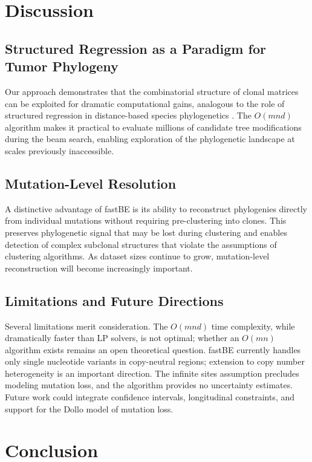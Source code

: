 \documentclass[11pt]{article}
\begin{document}
\section{Discussion}

\subsection{Structured Regression as a Paradigm for Tumor Phylogeny}

Our approach demonstrates that the combinatorial structure of clonal matrices can be exploited for dramatic computational gains, analogous to the role of structured regression in distance-based species phylogenetics \citep{desper2002fast, price2010fasttree}. The $O(mnd)$ algorithm makes it practical to evaluate millions of candidate tree modifications during the beam search, enabling exploration of the phylogenetic landscape at scales previously inaccessible.

\subsection{Mutation-Level Resolution}

A distinctive advantage of fastBE is its ability to reconstruct phylogenies directly from individual mutations without requiring pre-clustering into clones. This preserves phylogenetic signal that may be lost during clustering and enables detection of complex subclonal structures that violate the assumptions of clustering algorithms. As dataset sizes continue to grow, mutation-level reconstruction will become increasingly important.

\subsection{Limitations and Future Directions}

Several limitations merit consideration. The $O(mnd)$ time complexity, while dramatically faster than LP solvers, is not optimal; whether an $O(mn)$ algorithm exists remains an open theoretical question. fastBE currently handles only single nucleotide variants in copy-neutral regions; extension to copy number heterogeneity is an important direction. The infinite sites assumption precludes modeling mutation loss, and the algorithm provides no uncertainty estimates. Future work could integrate confidence intervals, longitudinal constraints, and support for the Dollo model of mutation loss.

\section{Conclusion}
\end{document}
